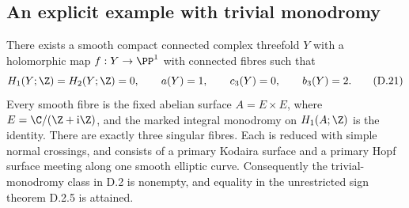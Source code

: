 \subsection{An explicit example with trivial monodromy}

\begin{theorem}
\label{st:D.2.7}
There exists a smooth compact connected complex threefold $Y$
with a holomorphic map $f:Y\to\PP^1$ with connected fibres such
that
\[
 H_1(Y;\Z)=H_2(Y;\Z)=0,\qquad
 a(Y)=1,\qquad c_3(Y)=0,\qquad b_3(Y)=2.
\tag{D.21}
\]
Every smooth fibre is the fixed abelian surface
$A=E\times E$, where $E=\C/(\Z+\mathrm i\Z)$, and the marked
integral monodromy on $H_1(A;\Z)$ is the identity. There are
exactly three singular fibres. Each is reduced with simple
normal crossings, and consists of a primary Kodaira surface
and a primary Hopf surface meeting along one smooth elliptic
curve. Consequently the trivial-monodromy class in D.2 is
nonempty, and equality in the unrestricted sign theorem
D.2.5 is attained.
\end{theorem}
